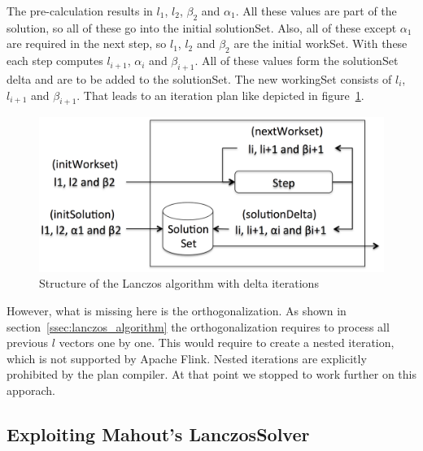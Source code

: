 The pre-calculation results in $l_1$, $l_2$, $\beta_2$ and $\alpha_1$. All these values are part of the solution, so all of these go into the initial solutionSet. Also, all of these except $\alpha_1$ are required in the next step, so $l_1$, $l_2$ and $\beta_2$ are the initial workSet. With these each step computes $l_{i+1}$, $\alpha_i$ and $\beta_{i+1}$. All of these values form the solutionSet delta and are to be added to the solutionSet. The new workingSet consists of  $l_{i}$, $l_{i+1}$ and $\beta_{i+1}$. That leads to an iteration plan like depicted in figure~\ref{fig:lanczos_delta_plan}.

\begin{figure}[h]
	\centering
	\includegraphics[scale=0.3]{images/lanczos_delta_plan.png}
    \caption{Structure of the Lanczos algorithm with delta iterations}
	\label{fig:lanczos_delta_plan}
\end{figure}

However, what is missing here is the orthogonalization. As shown in section~\ref{ssec:lanczos_algorithm} the orthogonalization requires to process all previous $l$ vectors one by one. This would require to create a nested iteration, which is not supported by Apache Flink. Nested iterations are explicitly prohibited by the plan compiler. At that point we stopped to work further on this apporach.


\subsection{Exploiting Mahout's LanczosSolver}

